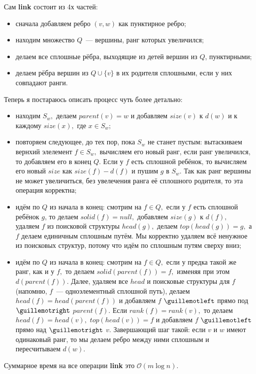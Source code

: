 Сам \textbf{link} состоит из 4х частей:
\begin{itemize}
    \item сначала добавляем ребро $(v, w)$ как пунктирное ребро;
    \item находим множество $Q$~--- вершины, ранг которых увеличился;
    \item делаем все сплошные рёбра, выходящие из детей вершин из $Q$, пунктирными;
    \item делаем рёбра вершин из $Q\cup \{v\}$ в их родителя сплошными, если у них совпадают ранги.
\end{itemize}
Теперь я постараюсь описать процесс чуть более детально:
\begin{itemize}
    \item находим $S_w,$ делаем $parent(v) = w$ и добавляем $size(v)$ к $d(w)$ и к каждому $size(x),$ где $x\in S_w;$
    \item повторяем следующее, до тех пор, пока $S_w$ не станет пустым: вытаскиваем вернхий элелемент $f\in S_w,$ вычисляем его новый ранг, если ранг увеличился, то добавляем его в конец $Q.$ Если у $f$ есть сплошной ребёнок, то вычисляем его новый $size$ как $size(f) - d(f)$ и пушим $g$ в $S_w.$ Так как ранг вершины не может увеличиться, без увелечения ранга её сплошного родителя, то эта операция корректна;
    \item идём по $Q$ из начала в конец: смотрим на $f\in Q,$ если у $f$ есть сплошной ребёнок $g$, то делаем $solid(f) = null,$ добавляем $size(g)$ к $d(f),$ удаляем $f$ из поисковой структуры $head(g),$ делаем $top(head(g)) = g,$ а $f$ делаем единичным сплошным путём. Мы корректно удаляем всё ненужное из поисковых структур, потому что идём по сплошным путям сверху вниз;
    \item идём по $Q$ из начала в конец: смотрим на $f\in Q,$ если у предка такой же ранг, как и у $f,$ то делаем $solid(parent(f)) = f,$ изменяя при этом $d(parent(f)).$ Далее, удаляем все $head$ и поисковые структуры для $f$ (напомню, $f$~--- одноэлементный сплошной путь), делаем $head(f) = head(parent(f))$ и добавляем $f$ $\guillemotleft$ прямо под $\guillemotright$ $parent(f).$ Если $rank(f) = rank(v),$ то делаем  $head(f) = head(v),$ $top(head(v)) = f$ и добавляем $f$ $\guillemotleft$ прямо над $\guillemotright$ $v.$ Завершающий шаг такой: если $v$ и $w$ имеют одинаковый ранг, то мы делаем ребро между ними сплошным и пересчитываем $d(w).$
\end{itemize}
\begin{lemma}
Суммарное время на все операции \textbf{link} это $\mathcal{O}(m\log{n}).$
\end{lemma}
